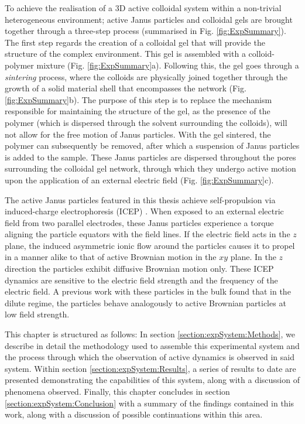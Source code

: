 To achieve the realisation of a 3D active colloidal system within a non-trivial heterogeneous environment; active Janus particles and colloidal gels are brought together through a three-step process (summarised in Fig. \ref{fig:ExpSummary}). The first step regards the creation of a colloidal gel that will provide the structure of the complex environment. This gel is assembled with a colloid-polymer mixture (Fig. \ref{fig:ExpSummary}a). Following this, the gel goes through a \textit{sintering} process, where the colloids are physically joined together through the growth of a solid material shell that encompasses the network (Fig. \ref{fig:ExpSummary}b). 
The purpose of this step is to replace the mechanism responsible for maintaining the structure of the gel, as the presence of the polymer (which is dispersed through the solvent surrounding the colloids), will not allow for the free motion of Janus particles.
With the gel sintered, the polymer can subsequently be removed, after which a suspension of Janus particles is added to the sample.  These Janus particles are dispersed throughout the pores surrounding the colloidal gel network, through which they undergo active motion upon the application of an external electric field (Fig. \ref{fig:ExpSummary}c).

The active Janus particles featured in this thesis achieve self-propulsion via induced-charge electrophoresis (ICEP) \cite{gangwal2008,nishiguchi2015,yan2016,vanderlinden2019}. When exposed to an external electric field from two parallel electrodes, these Janus particles experience a torque aligning the particle equators with the field lines. If the electric field acts in the $z$ plane, the induced asymmetric ionic flow around the particles causes it to propel in a manner alike to that of active Brownian motion in the $xy$ plane. In the $z$ direction the particles exhibit diffusive Brownian motion only.
These ICEP dynamics are sensitive to the electric field strength and the frequency of the electric field. A previous work \cite{sakai2020} with these particles in the bulk found that in the dilute regime, the particles behave analogously to active Brownian particles at low field strength.

This chapter is structured as follows: In section \ref{section:expSystem:Methods}, we describe in detail the methodology used to assemble this experimental system and the process through which the observation of active dynamics is observed in said system. Within section \ref{section:expSystem:Results}, a series of results to date are presented demonstrating the capabilities of this system, along with a discussion of phenomena observed. Finally, this chapter concludes in section \ref{section:expSystem:Conclusion} with a summary of the findings contained in this work, along with a discussion of possible continuations within this area.




